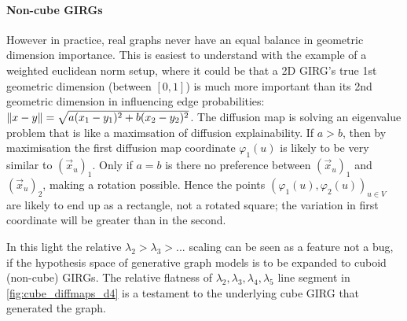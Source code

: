 \paragraph{Non-cube GIRGs} However in practice, real graphs never have an equal balance in geometric dimension importance. This is easiest to understand with the example of a weighted euclidean norm setup, where it could be that a 2D GIRG's true 1st geometric dimension (between $[0, 1]$) is much more important than its 2nd geometric dimension in influencing edge probabilities: $\left\lVert x - y\right\rVert = \sqrt{a (x_1 - y_1)^2 + b(x_2 - y_2)^2}$.
The diffusion map is solving an eigenvalue problem that is like a maximsation of diffusion explainability. If $a > b$, then by maximisation the first diffusion map coordinate $\varphi_1(u)$ is likely to be very similar to $(\vec{x}_u)_1$. Only if $a=b$ is there no preference between $(\vec{x}_u)_1$ and $(\vec{x}_u)_2$, making a rotation possible.
Hence the points $(\varphi_1(u), \varphi_2(u))_{u \in V}$ are likely to end up as a rectangle, not a rotated square; the variation in first coordinate will be greater than in the second.

In this light the relative $\lambda_2 > \lambda_3 > ...$ scaling can be seen as a feature not a bug, if the hypothesis space of generative graph models is to be expanded to cuboid (non-cube) GIRGs.
The relative flatness of $\lambda_2, \lambda_3, \lambda_4, \lambda_5$ line segment in \cref{fig:cube_diffmaps_d4} is a testament to the underlying cube GIRG that generated the graph.








